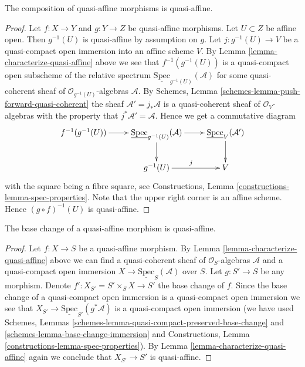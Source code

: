 \begin{lemma}
\label{lemma-composition-quasi-affine}
The composition of quasi-affine morphisms is quasi-affine.
\end{lemma}

\begin{proof}
Let $f : X \to Y$ and $g : Y \to Z$ be quasi-affine morphisms.
Let $U \subset Z$ be affine open. Then $g^{-1}(U)$ is quasi-affine
by assumption on $g$. Let $j : g^{-1}(U) \to V$ be a quasi-compact
open immersion into an affine scheme $V$.
By Lemma \ref{lemma-characterize-quasi-affine} above
we see that $f^{-1}(g^{-1}(U))$
is a quasi-compact open subscheme of the relative spectrum
$\underline{\text{Spec}}_{g^{-1}(U)}(\mathcal{A})$ for
some quasi-coherent sheaf of $\mathcal{O}_{g^{-1}(U)}$-algebras
$\mathcal{A}$. By
Schemes, Lemma \ref{schemes-lemma-push-forward-quasi-coherent}
the sheaf $\mathcal{A}' = j_*\mathcal{A}$
is a quasi-coherent sheaf of $\mathcal{O}_V$-algebras
with the property that $j^*\mathcal{A}' = \mathcal{A}$.
Hence we get a commutative diagram
$$
\xymatrix{
f^{-1}(g^{-1}(U)) \ar[r] &
\underline{\text{Spec}}_{g^{-1}(U)}(\mathcal{A})
\ar[r] \ar[d] &
\underline{\text{Spec}}_{V}(\mathcal{A}') \ar[d] \\
& g^{-1}(U) \ar[r]^j & V
}
$$
with the square being a fibre square,
see Constructions, Lemma \ref{constructions-lemma-spec-properties}.
Note that the upper right corner is an affine scheme.
Hence $(g \circ f)^{-1}(U)$ is quasi-affine.
\end{proof}

\begin{lemma}
\label{lemma-base-change-quasi-affine}
The base change of a quasi-affine morphism is quasi-affine.
\end{lemma}

\begin{proof}
Let $f : X \to S$ be a quasi-affine morphism.
By Lemma \ref{lemma-characterize-quasi-affine} above
we can find a quasi-coherent sheaf
of $\mathcal{O}_S$-algebras $\mathcal{A}$ and a quasi-compact
open immersion $X \to \underline{\text{Spec}}_S(\mathcal{A})$
over $S$.
Let $g : S' \to S$ be any morphism.
Denote $f' : X_{S'} = S' \times_S X \to S'$ the base change of $f$.
Since the base change of a quasi-compact open immersion is
a quasi-compact open immersion we see that
$X_{S'} \to \underline{\text{Spec}}_{S'}(g^*\mathcal{A})$
is a quasi-compact open immersion
(we have used Schemes, Lemmas
\ref{schemes-lemma-quasi-compact-preserved-base-change} and
\ref{schemes-lemma-base-change-immersion} and
Constructions, Lemma \ref{constructions-lemma-spec-properties}).
By Lemma \ref{lemma-characterize-quasi-affine} again
we conclude that $X_{S'} \to S'$ is quasi-affine.
\end{proof}

